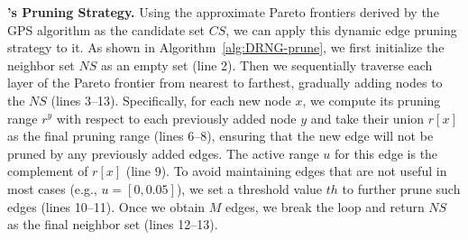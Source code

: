 
\begin{algorithm}[!t]
    \caption{}
    \small
    \label{alg:DRNG-prune}
    \BlankLine    
\end{algorithm}


\noindent\textbf{\method's Pruning Strategy.} Using the approximate Pareto frontiers derived by the GPS algorithm as the candidate set $CS$, we can apply this dynamic edge pruning strategy to it. As shown in Algorithm~\ref{alg:DRNG-prune}, we first initialize the neighbor set $NS$ as an empty set (line 2). Then we sequentially traverse each layer of the Pareto frontier from nearest to farthest, gradually adding nodes to the $NS$ (lines 3--13). Specifically, for each new node $x$, we compute its pruning range $r^y$ with respect to each previously added node $y$ and take their union $r[x]$ as the final pruning range (lines 6--8), ensuring that the new edge will not be pruned by any previously added edges. The active range $u$ for this edge is the complement of $r[x]$ (line 9). To avoid maintaining edges that are not useful in most cases (e.g., $u = [0, 0.05]$), we set a threshold value $th$ to further prune such edges (lines 10--11). Once we obtain $M$ edges, we break the loop and return $NS$ as the final neighbor set (lines 12--13).


